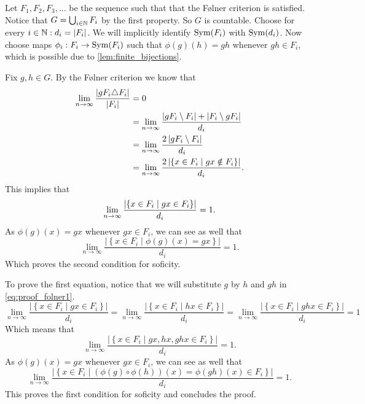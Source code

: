 Let $F_1, F_2, F_3, \dots $ be the sequence such that that the Følner criterion is satisfied. Notice that $G = \bigcup_{i \in \mathbb{N}} F_i$ by the first property. So $G$ is countable. 
Choose for every $i \in \mathbb{N}: d_i = |F_i|$. We will implicitly identify $\operatorname{Sym}(F_i)$ with $\operatorname{Sym}(d_i)$. Now choose maps $\phi_i: F_i \to \operatorname{Sym}(F_i)$ such that $\phi(g)(h) = gh$ whenever $gh \in F_i$, which is possible due to \cref{lem:finite_bijections}. 

Fix $g, h \in G$. By the Følner criterion we know that
\begin{align*}
    \lim_{n\to \infty} \frac{\left| gF_i \triangle F_i \right|}{\left| F_i \right|} &= 0\\
    &= \lim_{n\to \infty} \frac{\left| gF_i \setminus F_i \right| + \left| F_i \setminus gF_i \right|}{d_i}\\
    &= \lim_{n\to \infty} \frac{2\left|  gF_i \setminus F_i  \right|}{d_i}\\
    &= \lim_{n\to \infty} \frac{2\left| \left\{ x \in F_i \mid gx \notin F_i \right\} \right|}{d_i}. 
\end{align*}
This implies that \begin{equation}\label{eq:proof_folner1}
    \lim_{n\to \infty} \frac{\left| \left\{ x \in F_i \mid gx \in F_i \right\} \right|}{d_i} = 1.
\end{equation}
As $\phi(g)(x) = gx$ whenever $gx \in F_i$, we can see as well that $$\lim_{n\to \infty} \frac{\left|\left\{ x \in F_i \mid \phi(g)(x) = gx \right\}\right|}{d_i} = 1.$$
Which proves the second condition for soficity. 

To prove the first equation, notice that we will substitute $g$ by $h$ and $gh$ in \cref{eq:proof_folner1}.
$$ \lim_{n\to \infty} \frac{\left|\left\{ x \in F_i \mid gx \in F_i \right\}\right|}{d_i} =
\lim_{n\to \infty} \frac{\left|\left\{ x \in F_i \mid hx \in F_i \right\}\right|}{d_i} =
\lim_{n\to \infty} \frac{\left|\left\{ x \in F_i \mid ghx \in F_i \right\}\right|}{d_i}= 1$$
Which means that 
$$\lim_{n\to \infty} \frac{\left|\left\{ x \in F_i \mid gx,hx,ghx \in F_i \right\}\right|}{d_i}= 1.$$
As $\phi(g)(x) = gx$ whenever $gx \in F_i$, we can see as well that
$$\lim_{n\to \infty} \frac{\left|\left\{ x \in F_i \mid (\phi(g) \circ\phi(h))(x) = \phi(gh)(x) \in F_i \right\}\right|}{d_i}= 1.$$
This proves the first condition for soficity and concludes the proof. 
